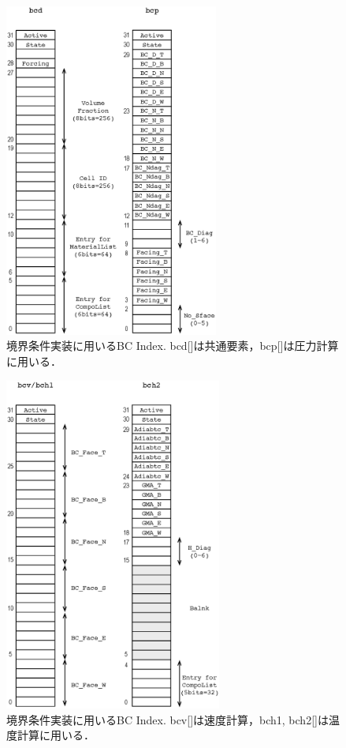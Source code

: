 \begin{figure}[htbp]
\begin{center}
\includegraphics[height=11cm,clip]{BCindexDP.eps}
\end{center}
\caption{境界条件実装に用いるBC Index. bcd[]は共通要素，bcp[]は圧力計算に用いる．}
\label{fig:BCIndexDP}
\end{figure}

\begin{figure}[htbp]
\begin{center}
\includegraphics[height=11cm,clip]{BCindexVH.eps}
\end{center}
\caption{境界条件実装に用いるBC Index. bcv[]は速度計算，bch1, bch2[]は温度計算に用いる．}
\label{fig:BCIndexVH}
\end{figure}

